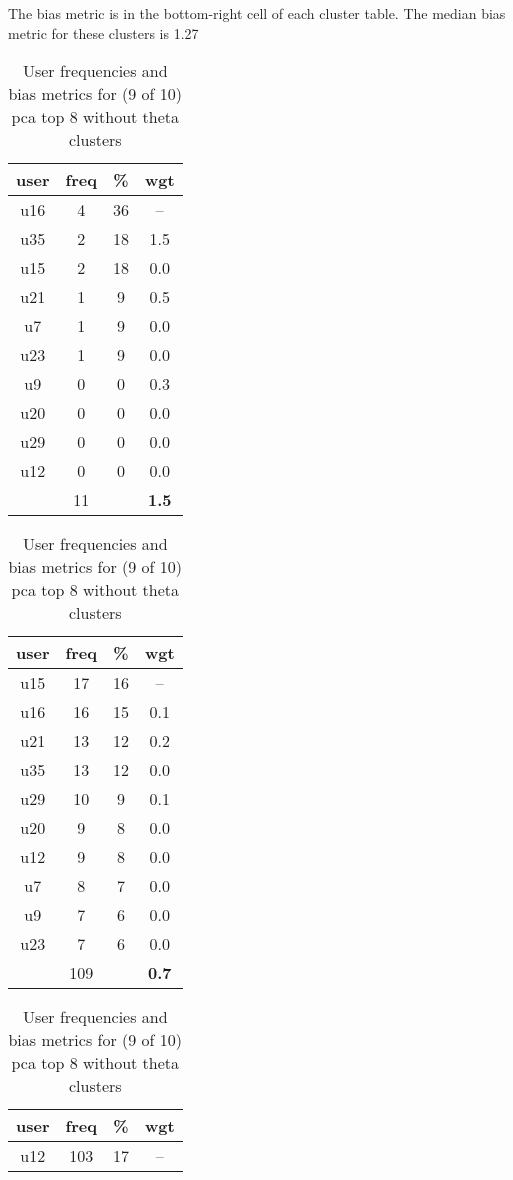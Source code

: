\begin{appendices}
\begin{table}
\centering
\caption{User frequencies and bias metrics for (9 of 10) pca top 8 without theta clusters}
{\small The bias metric is in the bottom-right cell of each cluster table. The median bias metric for these clusters is 1.27 \\}
\bigskip
\begin{tabular}{ |c|c|c|c| }
	\hline
	\textbf{user} & \textbf{freq} & \textbf{\%} & \textbf{wgt} \\
	\hline
	u16 & 4 & 36 & -- \\
	u35 & 2 & 18 & 1.5 \\
	u15 & 2 & 18 & 0.0 \\
	u21 & 1 & 9 & 0.5 \\
	u7 & 1 & 9 & 0.0 \\
	u23 & 1 & 9 & 0.0 \\
	u9 & 0 & 0 & 0.3 \\
	u20 & 0 & 0 & 0.0 \\
	u29 & 0 & 0 & 0.0 \\
	u12 & 0 & 0 & 0.0 \\
	 & 11 & & \textbf{1.5} \\
	\hline
\end{tabular}
\begin{tabular}{ |c|c|c|c| }
	\hline
	\textbf{user} & \textbf{freq} & \textbf{\%} & \textbf{wgt} \\
	\hline
	u15 & 17 & 16 & -- \\
	u16 & 16 & 15 & 0.1 \\
	u21 & 13 & 12 & 0.2 \\
	u35 & 13 & 12 & 0.0 \\
	u29 & 10 & 9 & 0.1 \\
	u20 & 9 & 8 & 0.0 \\
	u12 & 9 & 8 & 0.0 \\
	u7 & 8 & 7 & 0.0 \\
	u9 & 7 & 6 & 0.0 \\
	u23 & 7 & 6 & 0.0 \\
	 & 109 & & \textbf{0.7} \\
	\hline
\end{tabular}
\begin{tabular}{ |c|c|c|c| }
	\hline
	\textbf{user} & \textbf{freq} & \textbf{\%} & \textbf{wgt} \\
	\hline
	u12 & 103 & 17 & -- \\

\end{tabular}
\end{table}
\end{appendices}
